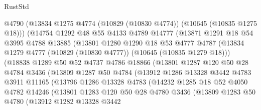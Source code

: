 \begin{lexlean}{RustStd}
\begin{coremodule}
                @4790
                (@13834 @1275 @4774 (@10829 (@10830 @4774)) (@10645 (@10835 @1275 @18)))
                (@14754
                  @1292
                  @48
                  @55
                  @4133
                  @4789
                  @14777
                  (@13871
                    @1291
                    @18
                    @54
                    @3995
                    @4788
                    @13885
                    (@13801
                      @1280
                      @1290
                      @18
                      @53
                      @4777
                      @4787
                      (@13834 @1279 @4777 (@10829 (@10830 @4777)) (@10645 (@10835 @1279 @18)))
                      (@18838
                        @1289
                        @50
                        @52
                        @4737
                        @4786
                        @18866
                        (@13801
                          @1287
                          @120
                          @50
                          @28
                          @4784
                          @3436
                          (@13809
                            @1287
                            @50
                            @4784
                            (@13912
                              @1286
                              @13328
                              @3442
                              @4783
                              @3911
                              @11165
                              (@13796
                                @1286
                                @13328
                                @4783
                                (@14232
                                  @1285
                                  @18
                                  @52
                                  @4050
                                  @4782
                                  @14246
                                  (@13801
                                    @1283
                                    @120
                                    @50
                                    @28
                                    @4780
                                    @3436
                                    (@13809
                                      @1283
                                      @50
                                      @4780
                                      (@13912
                                        @1282
                                        @13328
                                        @3442

\end{coremodule}
\end{lexlean}
